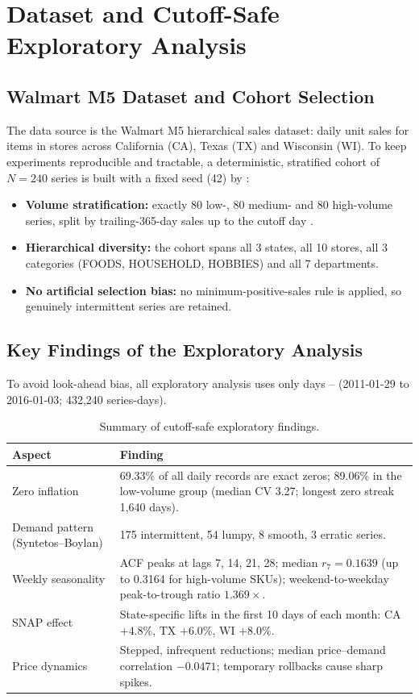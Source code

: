 \documentclass[11pt,a4paper]{article}
\DeclareRobustCommand{\code}[1]{\texttt{\detokenize{#1}}}
\begin{document}
\section{Dataset and Cutoff-Safe Exploratory Analysis}

\subsection{Walmart M5 Dataset and Cohort Selection}
The data source is the Walmart M5 hierarchical sales dataset: daily unit sales for items in stores across California (CA), Texas (TX) and Wisconsin (WI). To keep experiments reproducible and tractable, a deterministic, stratified cohort of $N=240$ series is built with a fixed seed (42) by \code{src/data/select_skus.py}:
\begin{itemize}[leftmargin=2em,itemsep=2pt]
  \item \textbf{Volume stratification:} exactly 80 low-, 80 medium- and 80 high-volume series, split by trailing-365-day sales up to the cutoff day \code{d1801}.
  \item \textbf{Hierarchical diversity:} the cohort spans all 3 states, all 10 stores, all 3 categories (FOODS, HOUSEHOLD, HOBBIES) and all 7 departments.
  \item \textbf{No artificial selection bias:} no minimum-positive-sales rule is applied, so genuinely intermittent series are retained.
\end{itemize}

\subsection{Key Findings of the Exploratory Analysis}
To avoid look-ahead bias, all exploratory analysis uses only days \code{d1}--\code{d1801} (2011-01-29 to 2016-01-03; 432,240 series-days).

\begin{table}[H]
\centering
\caption{Summary of cutoff-safe exploratory findings.}
\label{tab:eda}
\small
\renewcommand{\arraystretch}{1.25}
\begin{tabularx}{\textwidth}{@{}l X@{}}
\toprule
\textbf{Aspect} & \textbf{Finding}\\
\midrule
Zero inflation & 69.33\% of all daily records are exact zeros; 89.06\% in the low-volume group (median CV 3.27; longest zero streak 1,640 days).\\
Demand pattern (Syntetos--Boylan) & 175 intermittent, 54 lumpy, 8 smooth, 3 erratic series.\\
Weekly seasonality & ACF peaks at lags 7, 14, 21, 28; median $r_7=0.1639$ (up to 0.3164 for high-volume SKUs); weekend-to-weekday peak-to-trough ratio $1.369\times$.\\
SNAP effect & State-specific lifts in the first 10 days of each month: CA $+4.8\%$, TX $+6.0\%$, WI $+8.0\%$.\\
Price dynamics & Stepped, infrequent reductions; median price--demand correlation $-0.0471$; temporary rollbacks cause sharp spikes.\\
\bottomrule
\end{tabularx}
\end{table}
\end{document}
